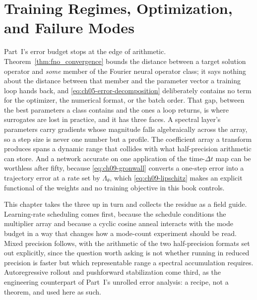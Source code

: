 
\chapter{Training Regimes, Optimization, and Failure Modes}
\label{ch:part2-training-regimes-optimization-and-failure-}
\label{sec:training}

Part~I's error budget stops at the edge of arithmetic. Theorem~\ref{thm:fno_convergence}
bounds the distance between a target solution operator and \emph{some} member of the
Fourier neural operator class; it says nothing about the distance between that member and
the parameter vector a training loop hands back, and \eqref{eq:ch05-error-decomposition}
deliberately contains no term for the optimizer, the numerical format, or the batch order.
That gap, between the best parameters a class contains and the ones a loop returns, is where
surrogates are lost in practice, and it has three faces. A spectral layer's parameters carry
gradients whose magnitude falls algebraically across the array, so a step size is never one
number but a profile. The coefficient array a transform produces spans a dynamic range that
collides with what half-precision arithmetic can store. And a network accurate on one
application of the time-$\Delta t$ map can be worthless after fifty, because
\eqref{eq:ch09-gronwall} converts a one-step error into a trajectory error at a rate set by
$\Lambda_\theta$, which \eqref{eq:ch09-lipschitz} makes an explicit functional of the weights
and no training objective in this book controls.

This chapter takes the three up in turn and collects the residue as a field guide.
Learning-rate scheduling comes first, because the schedule conditions the multiplier array
and because a cyclic cosine anneal interacts with the mode budget in a way that changes how
a mode-count experiment should be read. Mixed precision follows, with the arithmetic of the
two half-precision formats set out explicitly, since the question worth asking is not whether
running in reduced precision is faster but which representable range a spectral accumulation
requires. Autoregressive rollout and pushforward stabilization come third, as the engineering
counterpart of Part~I's
unrolled error analysis: a recipe, not a theorem, and used here as such.


